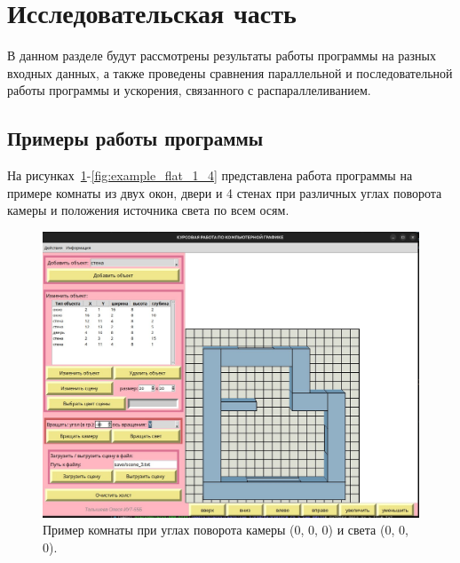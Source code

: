 \section{Исследовательская часть}

\hspace{1.25cm}
В данном разделе будут рассмотрены результаты работы программы на разных входных данных, а также проведены сравнения параллельной и последовательной работы программы и ускорения, связанного с распараллеливанием.


\subsection{Примеры работы программы}

\hspace{1.25cm}
На рисунках~\ref{fig:example_flat_1_1}-\ref{fig:example_flat_1_4} представлена работа программы на примере комнаты из двух окон, двери и 4 стенах при различных углах поворота камеры и положения источника света по всем осям.

\begin{figure}[H]
    \centering
    \includegraphics[width=1\textwidth]{img/example_light_0_0_0_camera_0_0_0.png}
    \caption{Пример комнаты при углах поворота камеры (0, 0, 0) и света (0, 0, 0).}
    \label{fig:example_flat_1_1}
\end{figure}

